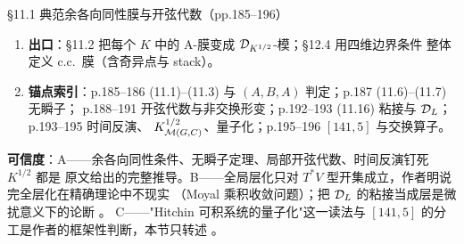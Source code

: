 \begin{kcard}{\S11.1 典范余各向同性膜与开弦代数（pp.185--196）}
\begin{enumerate}[label=\textbf{\arabic*}]
  在 $\Psi=0$ 时写成 $\omega-\ii F=-\ii\operatorname{Im}\tau\,\Omega_I$ 的势；限制到
  $T^*V\subset\MH$（$V\subset\MC$ 小开集）后，局部的乘法由 Poisson 括号
  $[\kappa,f]=-\ii(\operatorname{Im}\tau)^{-1}\kappa(f)$ 给出，而 $\hat p_\alpha=
  -\frac{\ii}{\operatorname{Im}\tau}\frac{\partial}{\partial q^\alpha}$，即全纯微分算子
  \pA{}。全局：粘接函数 $s^{(ij)}$ 的三重上链
  $c^{(ijk)}=s^{(ij)}+s^{(jk)}+s^{(ki)}\in H^2(\MC,\CC)$；若 $c\in2\pi\ZZ$ 得到线丛 $L$ 上的
  $\Dmod_L$，否则得到复幂 $\Dmod_{L^\gamma}$ \pA{}。
  时间反演 $T$（$t=1$ 处的精确对称，$(\mathbf A,\varphi)\mapsto(T^*\mathbf A,-T^*\varphi)$）把
  开弦代数映到 opposite；$\Dmod_L$ 的 opposite 是 $\Dmod_{L^{-1}\otimes K_M}$，自对偶要求
  $L^2=K_M$，即 $L=K_M^{1/2}$（$\MC$ 是 spin 流形，且平坦扭不改变层）\pA{}%
  。整体截面：经典时是 $\MH$ 上的全纯函数，即可积系统的交换 Hamiltonians；
  量子化即把 $w=\sum f^{\alpha\beta\gamma}p_\alpha p_\beta p_\gamma+\cdots$ 提升为符号等于 $w$
  的微分算子 $\hat w$，存在性对二阶是 Hitchin $[141]$、任意阶是 Beilinson--Drinfeld $[5]$，
  而 $T$ 给出存在性与交换性的简洁论证 \pA{}。
\item \textbf{出口}：\S11.2 把每个 $K$ 中的 A-膜变成 $\mathcal{D}_{K^{1/2}}$-模；\S12.4 用四维边界条件
  整体定义 c.c.\ 膜（含奇异点与 stack）。
\item \textbf{锚点索引}：p.185--186 (11.1)--(11.3) 与 $(A,B,A)$ 判定；p.187 (11.6)--(11.7) 无瞬子；
  p.188--191 开弦代数与非交换形变；p.192--193 (11.16) 粘接与 $\Dmod_L$；p.193--195 时间反演、
  $K_{\mathcal{M}(G,C)}^{1/2}$、量子化；p.195--196 $[141,5]$ 与交换算子。
\end{enumerate}
\textbf{可信度}：A——余各向同性条件、无瞬子定理、局部开弦代数、时间反演钉死 $K^{1/2}$ 都是
原文给出的完整推导。B——全局层化只对 $T^*V$ 型开集成立，作者明说完全层化在精确理论中不现实
（Moyal 乘积收敛问题）；把 $\mathcal{D}_{L}$ 的粘接当成层是微扰意义下的论断 \pB{}。
C——"Hitchin 可积系统的量子化"这一读法与 $[141,5]$ 的分工是作者的框架性判断，本节只转述
\pC{}。
\end{kcard}

